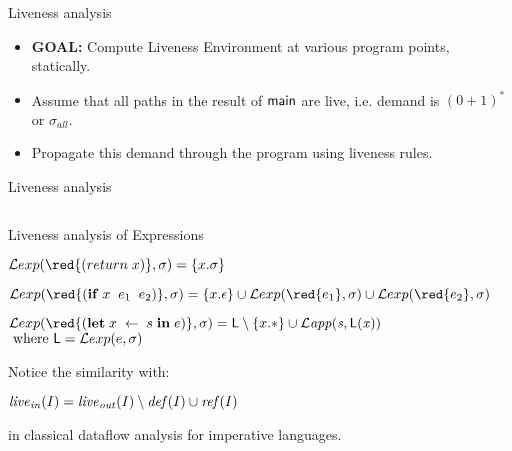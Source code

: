 \documentclass[xcolor=x11names,compress,mathserif]{beamer}
\renewcommand{\(}{\begin{columns}}
\renewcommand{\)}{\end{columns}}
\newcommand{\<}[1]{\begin{column}{#1}}
\renewcommand{\>}{\end{column}}
\begin{document}

\begin{frame}{Liveness analysis}
  \begin{itemize}
  \item {\bf  GOAL:} Compute  Liveness Environment at  various program
    points, statically. 
  \item Assume that all paths in the result of ${\sf main}$ are live, i.e. demand is $(0 + 1)^*$ or $\sigma_{all}$.
  \item Propagate this demand through the program using liveness rules.
  \end{itemize}
\end{frame}
\begin{frame}{Liveness analysis}
  \begin{columns}
    \begin{column}[T]{0.5\textwidth}
      
    \end{column}
    \begin{column}[T]{0.5\textwidth}
    \end{column}
  \end{columns}
\end{frame}


\begin{frame}{Liveness analysis of Expressions}

\normalsize
$\Lexp{{\red{(return\; x)}}}{\sigma} = \{x.\sigma\}$


\bigskip
\medskip

  $\Lexp{{\red{(\SIF \; x\;\;  e_1\; \; e_2)}}}{\sigma} = \{x.\epsilon\} 
 \cup \Lexp{{\red{ e_1}}}{\sigma} \cup \Lexp{{\red{e_2}}}{\sigma}$



\bigskip
\medskip

$  \Lexp{{\red{(\LET \; x\; \leftarrow \; s \; \IN \; e)}}}{\sigma} = \Lv
           \setminus \{x.*\}
           \cup \mathit{\Lapp{s}{\Lv(x)}}$\\
\hspace*{4.5cm} $ \mbox{ where } \mathsf{L} = \mathcal{L}exp(e,\sigma)$

\bigskip

\pause
Notice the similarity with:
\bigskip

\centerline{$\mathit{live}_\mathit{in}(I)      =     \mathit{live}_\mathit{out}(I)
\setminus \mathit{def\/}(I) \cup \mathit{ref\/}(I)$}
\bigskip

in classical dataflow analysis for imperative languages.
\end{frame}
\end{document}
